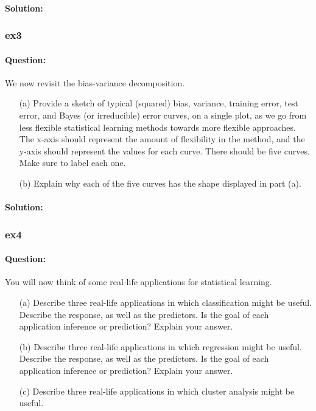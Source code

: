 \documentclass[a4paper,12pt,titlepage]{article} %
\begin{document}
\paragraph{Solution:}

\subsubsection{ex3}
\paragraph{Question:} We now revisit the bias-variance decomposition.

\begin{itemize}
	\item[(a)] Provide a sketch of typical (squared) bias, variance, training error, test error, and Bayes (or irreducible) error curves, on a single plot, as we go from less flexible statistical learning methods towards more flexible approaches. The x-axis should represent the amount of flexibility in the method, and the y-axis should represent the values for each curve. There should be five curves.	Make sure to label each one.
	\item[(b)] Explain why each of the five curves has the shape displayed in part (a).	
\end{itemize}
\paragraph{Solution:}

\subsubsection{ex4}
\paragraph{Question:} You will now think of some real-life applications for statistical learning.

\begin{itemize}
	\item[(a)] Describe three real-life applications in which classification might be useful. Describe the response, as well as the predictors. Is the goal of each application inference or prediction? Explain your answer.
	\item[(b)] Describe three real-life applications in which regression might be useful. Describe the response, as well as the predictors. Is the goal of each application inference or prediction? Explain your answer.
	\item[(c)] Describe three real-life applications in which cluster analysis might be useful.	
\end{itemize}
\end{document}
